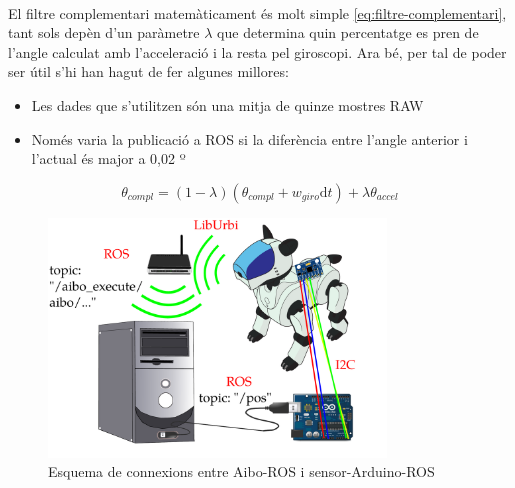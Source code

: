 \documentclass[12pt,a4paper,final,twoside]{article}
\begin{document}
\paragraph{}El filtre complementari matemàticament és molt simple \eqref{eq:filtre-complementari}, tant sols depèn d'un paràmetre $\lambda$ que determina quin percentatge es pren de l'angle calculat amb l'acceleració i la resta pel giroscopi. Ara bé, per tal de poder ser útil s'hi han hagut de fer algunes millores:

\begin{itemize}
\item Les dades que s'utilitzen són una mitja de quinze mostres RAW
\item Només varia la publicació a ROS si la diferència entre l'angle anterior i l'actual és major a 0,02 º
\end{itemize}

\begin{equation} 
\theta_{compl} = (1 - \lambda)(\theta_{compl} + w_{giro}\mathrm{d}t) + \lambda \theta_{accel} \label{eq:filtre-complementari}
\end{equation}

\begin{figure}[h]
\centering
\includegraphics[width=0.8\textwidth]{Imatges/esquema-comunicacio-ROS-Aibo-ordenadora.pdf}
\caption{Esquema de connexions entre Aibo-ROS i sensor-Arduino-ROS}
\label{fig:connexions-Aibo-ROS-sensor-Arduino-ROS}
\end{figure}

\end{document}
